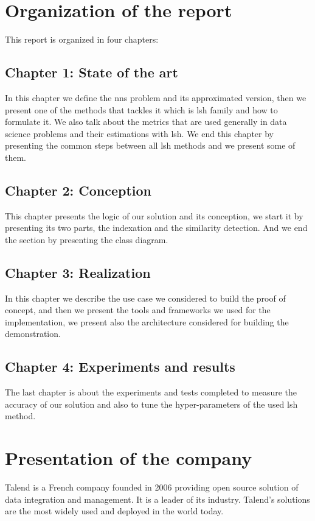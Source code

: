 \section*{Organization of the report}

This report is organized in four chapters:

\subsection*{Chapter 1: State of the art}
In this chapter we define the \acrfull{nns} problem and its approximated
version, then we present one of the methods that tackles it which is
\acrfull{lsh} family and how to formulate it. We also talk about the metrics
that are used generally in data science problems and their estimations with
\acrshort{lsh}. We end this chapter by presenting the common steps between all
\acrshort{lsh} methods and we present some of them.

\subsection*{Chapter 2: Conception}
This chapter presents the logic of our solution and its conception, we start it
by presenting its two parts, the indexation and the similarity detection. And we
end the section by presenting the class diagram.


\subsection*{Chapter 3: Realization}
In this chapter we describe the use case we considered to build the proof of
concept, and then we present the tools and frameworks we used for the
implementation, we present also the architecture considered for building the
demonstration.

\subsection*{Chapter 4: Experiments and results}
The last chapter is about the experiments and tests completed to measure the
accuracy of our solution and also to tune the hyper-parameters of the used
\acrfull{lsh} method. 


\section*{Presentation of the company}
Talend is a French company founded in 2006 providing open source solution of
data integration and management. It is a leader of its industry. Talend's
solutions are the most widely used and deployed in the world today.

